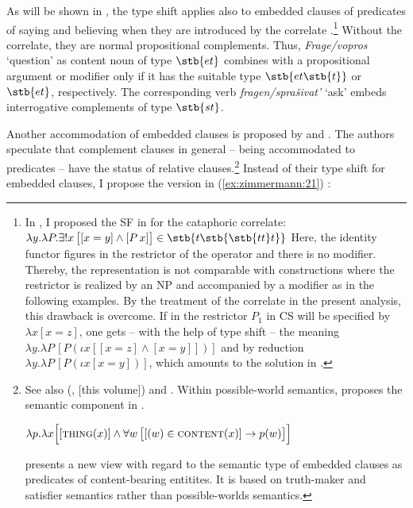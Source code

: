 \documentclass[output=paper]{langscibook}
\begin{document}
As will be shown in , the type shift  applies also to embedded clauses of predicates of saying and believing when they are introduced by the correlate \citep{Zimmermann2016b,Zimmermann2016a, Zimmermann2019a}.\footnote{In \citet[33]{Zimmermann2016a}, I proposed the SF in  for the cataphoric correlate:
\ea\label{ex:zimmermann:cc} $\lambda y . \lambda P .\exists!x \, \big[[x = y] \wedge [P \, x]\big] \in \stb{t\stb{{\stb{tt} t}}}$ \z
Here, the identity functor figures in the restrictor of the operator and there is no modifier. Thereby, the representation is not comparable with constructions where the restrictor is realized by an NP and accompanied by a modifier as in the following examples. By the treatment of the correlate in the present analysis, this drawback is overcome. If in  the restrictor $P_1$ in CS will be specified by $\lambda x [x = z]$, one gets -- with the help of type shift  -- the meaning $\lambda y . \lambda P \, [P (\iota x[[x = z] \wedge [x = y]])]$ and by reduction $\lambda y . \lambda P \, [P (\iota x [x = y])]$, which amounts to the solution in \citet[33]{Zimmermann2016a}.}
Without the correlate, they are normal propositional complements. Thus, \textit{Frage/vopros} `question' as content noun of type $\stb{et}$ combines with a propositional argument or modifier only if it has the suitable type $\stb{et\stb{t}}$ or $\stb{et}$, respectively. The corresponding verb \textit{fragen/sprašivat'} `ask' embeds interrogative complements of type $\stb{st}$.


\label{s:2.4.1.2}

Another accommodation of embedded clauses is proposed by \citet{Kratzer2006,Kratzer2015,Kratzer2016,Moulton2014,Moulton2015,Moulton2017,Hanink2016} and \citet{Bogal-AllbrittenMoulton2018}. The authors speculate that complement clauses in general -- being accommodated to predicates -- have the status of relative clauses.\footnote{\label{fn:possibleworlds}See also \citeauthor{Arsenijevic2009} (\citeyear{Arsenijevic2009}, \citeyear{chapters/arsenijevic} [this volume]) and \citet{CaponigroPolinsky2011}. Within possible-world semantics, \citet{Kratzer2016} proposes the semantic component in .

\ea\label{ex:zimmermann:fn28} $\lambda p . \lambda x \Big[[\textsc{thing} (x)] \wedge \forall w \, \big[[{(w)} \in \textsc{content} (x)] \rightarrow p(w)\big]\Big]$ \z

\noindent \citet{Moltmann2020} presents a new view with regard to the semantic type of embedded clauses as predicates of content-bearing entitites. It is based on truth-maker and satisfier semantics rather than possible-worlds semantics.} Instead of their type shift for embedded clauses, I propose the version in (\ref{ex:zimmermann:21}) \citep[see][]{Zimmermann2016b,Zimmermann2018a,Zimmermann2019a,Zimmermann2019c}:
\end{document}
